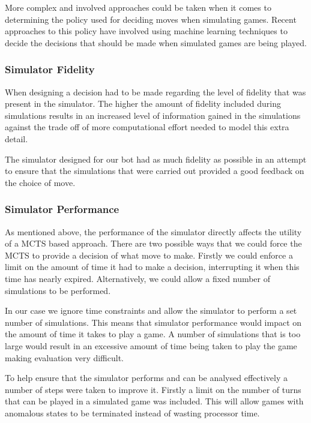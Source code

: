 \documentclass[]{article}
\begin{document}
\par More complex and involved approaches could be taken when it comes to determining the policy used for deciding moves when simulating games. Recent approaches to this policy have involved using machine learning techniques to decide the decisions that should be made when simulated games are being played. 

\subsubsection{Simulator Fidelity}
When designing a decision had to be made regarding the level of fidelity that was present in the simulator. The higher the amount of fidelity included during simulations results in an increased level of information gained in the simulations against the trade off of more computational effort needed to model this extra detail.

\par The simulator designed for our bot had as much fidelity as possible in an attempt to ensure that the simulations that were carried out provided a good feedback on the choice of move. 

\subsubsection{Simulator Performance}
As mentioned above, the performance of the simulator directly affects the utility of a MCTS based approach. There are two possible ways that we could force the MCTS to provide a decision of what move to make. Firstly we could enforce a limit on the amount of time it had to make a decision, interrupting it when this time has nearly expired. Alternatively, we could allow a fixed number of simulations to be performed.

\par In our case we ignore time constraints and allow the simulator to perform a set number of simulations. This means that simulator performance would impact on the amount of time it takes to play a game. A number of simulations that is too large would result in an excessive amount of time being taken to play the game making evaluation very difficult.

\par To help ensure that the simulator performs and can be analysed effectively a number of steps were taken to improve it. Firstly a limit on the number of turns that can be played in a simulated game was included. This will allow games with anomalous states to be terminated instead of wasting processor time. 
\end{document}
